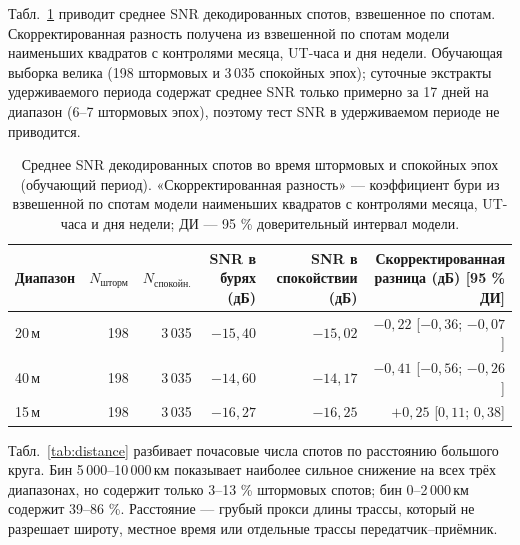\documentclass{agujournal2019}
\begin{document}
Табл.~\ref{tab:snr} приводит среднее SNR декодированных спотов, взвешенное
по спотам. Скорректированная разность получена из взвешенной по спотам
модели наименьших квадратов с контролями месяца, UT-часа и дня недели.
Обучающая выборка велика (198 штормовых и 3\,035 спокойных эпох);
суточные экстракты удерживаемого периода содержат среднее SNR только примерно за
17 дней на диапазон (6--7 штормовых эпох), поэтому тест SNR в удерживаемом периоде не приводится.

\begin{table}[h]
	\centering
	\footnotesize
	\setlength{\tabcolsep}{3pt}
	\caption{Среднее SNR декодированных спотов во время штормовых
		и спокойных эпох (обучающий период). «Скорректированная
		разность» — коэффициент бури из взвешенной по спотам модели
		наименьших квадратов с контролями месяца, UT-часа и дня недели;
		ДИ — 95 \% доверительный интервал модели.}
	\label{tab:snr}
	\begin{tabular}{lrrrrr}
		\toprule
		Диапазон & $N_{\mbox{шторм}}$ & $N_{\mbox{спокойн.}}$
		& \shortstack[b]{SNR в бурях\\(дБ)}
		& \shortstack[b]{SNR в спокойствии\\(дБ)}
		& \shortstack[b]{Скорректированная\\ разница (дБ) [95 \% ДИ]} \\
		\midrule
		20\,м & 198 & 3\,035 & $-15{,}40$ & $-15{,}02$ & $-0{,}22$ [$-0{,}36$; $-0{,}07$] \\
		40\,м & 198 & 3\,035 & $-14{,}60$ & $-14{,}17$ & $-0{,}41$ [$-0{,}56$; $-0{,}26$] \\
		15\,м & 198 & 3\,035 & $-16{,}27$ & $-16{,}25$ & $+0{,}25$ [$0{,}11$; $0{,}38$] \\
		\bottomrule
	\end{tabular}
\end{table}

Табл.~\ref{tab:distance} разбивает почасовые числа спотов по расстоянию
большого круга. Бин 5\,000--10\,000\,км показывает наиболее сильное снижение
на всех трёх диапазонах, но содержит только 3--13 \% штормовых спотов;
бин 0--2\,000\,км содержит 39--86 \%. Расстояние — грубый прокси длины
трассы, который не разрешает широту, местное время или отдельные трассы
передатчик--приёмник.
\end{document}
